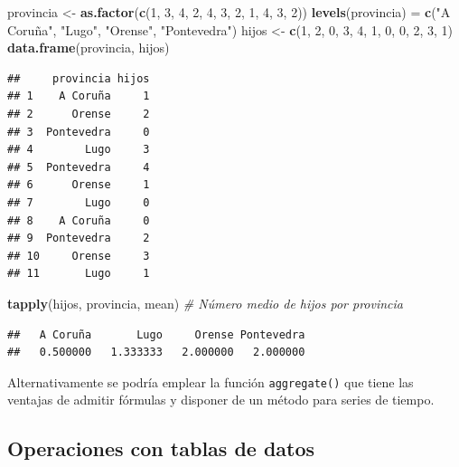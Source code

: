 \documentclass[]{book}
\newenvironment{Shaded}{\begin{snugshade}}{\end{snugshade}}
\newcommand{\KeywordTok}[1]{\textcolor[rgb]{0.13,0.29,0.53}{\textbf{#1}}}
\newcommand{\DecValTok}[1]{\textcolor[rgb]{0.00,0.00,0.81}{#1}}
\newcommand{\StringTok}[1]{\textcolor[rgb]{0.31,0.60,0.02}{#1}}
\newcommand{\CommentTok}[1]{\textcolor[rgb]{0.56,0.35,0.01}{\textit{#1}}}
\newcommand{\NormalTok}[1]{#1}
\begin{document}
\begin{Shaded}
\begin{Highlighting}[]
\NormalTok{provincia <-}\StringTok{ }\KeywordTok{as.factor}\NormalTok{(}\KeywordTok{c}\NormalTok{(}\DecValTok{1}\NormalTok{, }\DecValTok{3}\NormalTok{, }\DecValTok{4}\NormalTok{, }\DecValTok{2}\NormalTok{, }\DecValTok{4}\NormalTok{, }\DecValTok{3}\NormalTok{, }\DecValTok{2}\NormalTok{, }\DecValTok{1}\NormalTok{, }\DecValTok{4}\NormalTok{, }\DecValTok{3}\NormalTok{, }\DecValTok{2}\NormalTok{))}
\KeywordTok{levels}\NormalTok{(provincia) =}\StringTok{ }\KeywordTok{c}\NormalTok{(}\StringTok{"A Coruña"}\NormalTok{, }\StringTok{"Lugo"}\NormalTok{, }\StringTok{"Orense"}\NormalTok{, }\StringTok{"Pontevedra"}\NormalTok{)}
\NormalTok{hijos <-}\StringTok{ }\KeywordTok{c}\NormalTok{(}\DecValTok{1}\NormalTok{, }\DecValTok{2}\NormalTok{, }\DecValTok{0}\NormalTok{, }\DecValTok{3}\NormalTok{, }\DecValTok{4}\NormalTok{, }\DecValTok{1}\NormalTok{, }\DecValTok{0}\NormalTok{, }\DecValTok{0}\NormalTok{, }\DecValTok{2}\NormalTok{, }\DecValTok{3}\NormalTok{, }\DecValTok{1}\NormalTok{)}
\KeywordTok{data.frame}\NormalTok{(provincia, hijos)}
\end{Highlighting}
\end{Shaded}

\begin{verbatim}
##     provincia hijos
## 1    A Coruña     1
## 2      Orense     2
## 3  Pontevedra     0
## 4        Lugo     3
## 5  Pontevedra     4
## 6      Orense     1
## 7        Lugo     0
## 8    A Coruña     0
## 9  Pontevedra     2
## 10     Orense     3
## 11       Lugo     1
\end{verbatim}

\begin{Shaded}
\begin{Highlighting}[]
\KeywordTok{tapply}\NormalTok{(hijos, provincia, mean) }\CommentTok{# Número medio de hijos por provincia}
\end{Highlighting}
\end{Shaded}

\begin{verbatim}
##   A Coruña       Lugo     Orense Pontevedra 
##   0.500000   1.333333   2.000000   2.000000
\end{verbatim}

Alternativamente se podría emplear la función \texttt{aggregate()} que
tiene las ventajas de admitir fórmulas y disponer de un método para
series de tiempo.

\subsection{Operaciones con tablas de
datos}\label{operaciones-con-tablas-de-datos}
\end{document}
